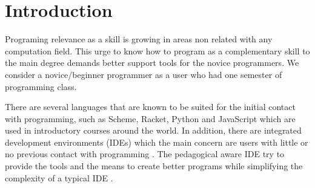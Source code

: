 \section{Introduction}




Programing relevance as a skill is growing in areas non related with any computation field.  %
This urge to know how to program as a complementary skill %
to the main degree demands better support tools for the novice programmers. %
We consider a novice/beginner programmer as a user who had one semester of programming class. %


There are several languages that are known to be suited for the initial contact %
with programming, such as Scheme, Racket, Python and JavaScript which are used in introductory
courses around the world.
In addition, there are integrated development environments (IDEs) which the main
concern are users with little or no previous contact with programming \cite{kolling2003bluej}. %
The pedagogical %
aware IDE try to provide the tools and the means to create better programs while simplifying
the complexity of a typical IDE \cite{pears2007survey}.%

